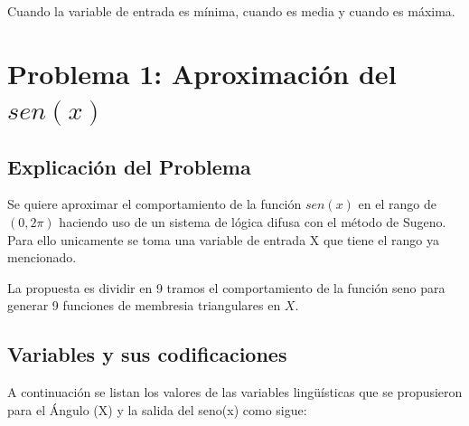 \documentclass[11pt, letterpaper]{article}
\begin{document}
Cuando la variable de entrada es mínima, cuando es media y cuando es máxima.

\newpage


\section{Problema 1: Aproximación del $sen(x)$}

\subsection{Explicación del Problema}

Se quiere aproximar el comportamiento de la función $sen(x)$ en el rango de $(0,2\pi)$ haciendo uso de un sistema de lógica difusa con el método de Sugeno. Para ello unicamente se toma una variable de entrada X que tiene el rango ya mencionado.

La propuesta es dividir en 9 tramos el comportamiento de la función seno para generar 9 funciones de membresia triangulares en $X$. 


\subsection{Variables y sus codificaciones}

A continuación se listan los valores de las variables lingüísticas que se propusieron para el Ángulo (X) y la salida del seno(x) como sigue:
\end{document}

